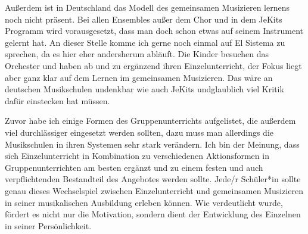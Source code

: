Außerdem ist in Deutschland das Modell des gemeinsamen Musizieren lernens noch nicht präsent. 
Bei allen Ensembles außer dem Chor und in
dem JeKits Programm wird vorausgesetzt, dass man doch schon etwas auf seinem
Instrument gelernt hat. An dieser Stelle komme ich gerne noch einmal auf El
Sistema zu sprechen, da es hier eher andersherum abläuft. Die Kinder besuchen
das Orchester und haben ab und zu ergänzend ihren Einzelunterricht, der Fokus
liegt aber ganz klar auf dem Lernen im gemeinsamen Musizieren. Das wäre an
deutschen Musikschulen undenkbar wie auch JeKits undglaublich viel Kritik dafür
einstecken hat müssen.

Zuvor habe ich einige Formen des Gruppenunterrichts aufgelistet, die außerdem
viel durchlässiger eingesetzt werden sollten, dazu muss man allerdings die
Musikschulen in ihren Systemen sehr stark verändern. Ich bin der Meinung, dass
sich Einzelunterricht in Kombination zu verschiedenen Aktionsformen in
Gruppenunterrichten am besten ergänzt und zu einem festen und auch
verpflichtenden Bestandteil des Angebotes werden sollte. Jede/r Schüler*in
sollte genau dieses Wechselspiel zwischen Einzelunterricht und gemeinsamen
Musizieren in seiner musikalischen Ausbildung erleben können. Wie verdeutlicht
wurde, fördert es nicht nur die Motivation, sondern dient der Entwicklung des
Einzelnen in seiner Persönlichkeit.

